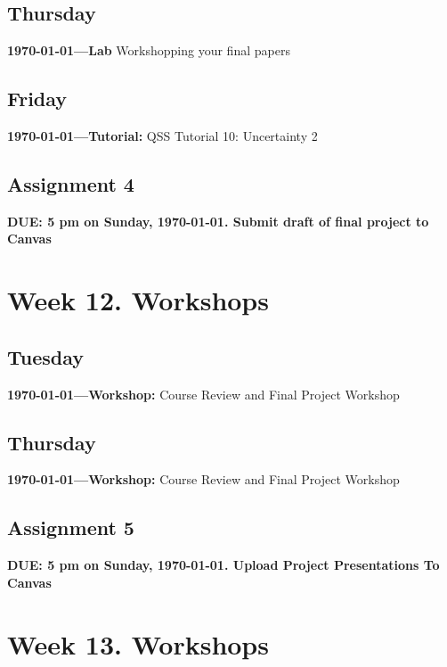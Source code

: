 \subsection{Thursday} \textbf{\today---Lab} Workshopping your final papers
\AdvanceDate[1]
\subsection{Friday} \textbf{\today---Tutorial:} QSS Tutorial 10: Uncertainty 2
\AdvanceDate[2]

\vspace{2em}
\subsection{Assignment 4} \textbf{DUE: 5 pm on Sunday, \today. Submit draft of final project to Canvas}

\AdvanceDate[2]


\vspace{2em}


\section{Week 12. Workshops }


\subsection{Tuesday} \textbf{\today---Workshop:} Course Review and Final Project Workshop
\AdvanceDate[2]

\subsection{Thursday } \textbf{\today---Workshop:} Course Review and Final Project Workshop

\AdvanceDate[3]

\vspace{2em}



\subsection{Assignment 5} \textbf{DUE: 5 pm on Sunday, \today. Upload Project Presentations To Canvas}
\AdvanceDate[2]
\vspace{2em}

\section{Week 13. Workshops }


